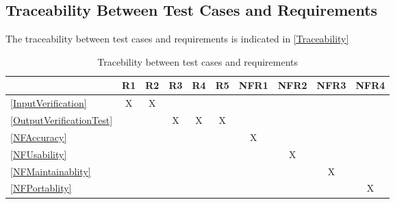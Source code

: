\documentclass[12pt, titlepage]{article}
\begin{document}
\subsection{Traceability Between Test Cases and Requirements}

The traceability between test cases and requirements is indicated in \autoref{Traceability} 



\begin{table}[h!]
\begin{center}
\begin{tabular}{ l|c|c|c|c|c|c|c|c|c }
\hline
 & R1 & R2 & R3 & R4 & R5 & NFR1 & NFR2 & NFR3 & NFR4 \\
\hline
\ref{InputVerification} & X & X & & & & & & \\
\hline
\ref{OutputVerificationTest} & & & X & X & X & & & \\
\hline
\ref{NFAccuracy} & & & & & & X & & \\
\hline
\ref{NFUsability} & & & & & & & X & \\
\hline
\ref{NFMaintainablity} & & & & & & & & X & \\
\hline
\ref{NFPortablity} & & & & & & & & & X \\
\hline
\end{tabular}
\caption{Tracebility between test cases and requirements}
\label{Traceability}
\end{center}
\end{table}




\end{document}
